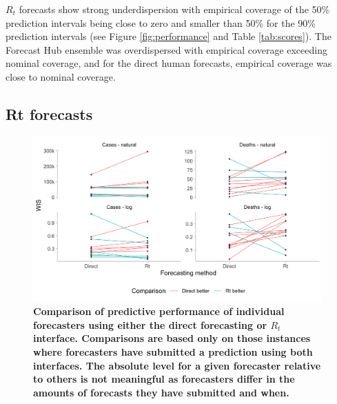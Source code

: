\documentclass[10pt,a4paper,twocolumn]{article}
\begin{document}
$R_t$ forecasts show strong underdispersion with empirical coverage of the 50\% prediction intervals being close to zero and smaller than 50\% for the 90\% prediction intervals (see Figure \ref{fig:performance} and Table \ref{tab:scores}). The Forecast Hub ensemble was overdispersed with empirical coverage exceeding nominal coverage, and for the direct human forecasts, empirical coverage was close to nominal coverage. 




\subsection*{Rt forecasts}

\begin{figure}
\centering
\includegraphics[width=0.99\textwidth]{../output/figures/comparison-direct-rt-individual.png}
\caption{\bf{Comparison of predictive performance of individual forecasters using either the direct forecasting or $R_t$ interface}. Comparisons are based only on those instances where forecasters have submitted a prediction using both interfaces. The absolute level for a given forecaster relative to others is not meaningful as forecasters differ in the amounts of forecasts they have submitted and when.}
\label{fig:comparison-direct-rt-individual}
\end{figure}
\end{document}
